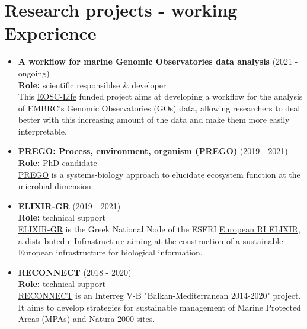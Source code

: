 \section*{Research projects - working Experience}

\begin{itemize}

   \item {
      \textbf{A workflow for marine Genomic Observatories data analysis} (2021 - ongoing) \\
      \textbf{Role:} scientific responsiblse \& developer \\ 
      This \href{https://www.eosc-life.eu/opencall/}{EOSC-Life} funded project aims at 
      developing a workflow for the analysis of EMBRC's Genomic Observatories (GOs) data, allowing researchers to deal better with this increasing amount of the data and make them more easily interpretable.
   }


   \item{
      \textbf{PREGO: Process, environment, organism (PREGO)} (2019 - 2021) \\ 
      \textbf{Role:} PhD candidate \\
      \href{http://prego.hcmr.gr/}{PREGO} is a systems-biology approach to elucidate ecosystem function at the microbial dimension.
   }

   \item {
      \textbf{ELIXIR-GR} (2019 - 2021) \\ 
      \textbf{Role:} technical support \\
      {\href{https://elixir-greece.org}{ELIXIR-GR}} is the Greek National Node of the ESFRI \href{https://elixir-europe.org/}{European RI ELIXIR}, 
      a distributed e-Infrastructure aiming at the construction of a sustainable European infrastructure for biological information.}

   \item{
      \textbf{RECONNECT} (2018 - 2020) \\
      \textbf{Role:} technical support \\ 
      \href{https://reconnect.hcmr.gr/}{RECONNECT} is an Interreg V-B "Balkan-Mediterranean 2014-2020" project. 
      It aims to develop strategies for sustainable management of Marine Protected Areas (MPAs) and Natura 2000 sites.   
   }

\end{itemize}





